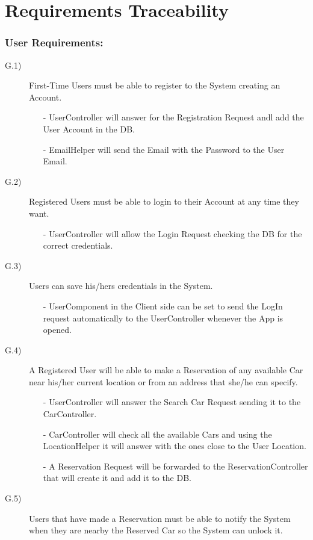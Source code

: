 \documentclass[a4paper]{article}
\begin{document}
\newpage
\section{Requirements Traceability}
\subsubsection{\textbf{User Requirements:}}
\begin{description}
\item [G.1)]First-Time Users must be able to register to the System creating an Account. 
\begin{itemize}
	\item[-]UserController will answer for the Registration Request andl add the User Account in the DB.
	\item[-]EmailHelper will send the Email with the Password to the User Email.
\end{itemize}
\item [G.2)]Registered Users must be able to login to their Account at any time they want.
\begin{itemize}
	\item[-]UserController will allow the Login Request checking the DB for the correct credentials.
\end{itemize}
\item [G.3)]Users can save his/hers credentials in the System.
\begin{itemize}
	\item[-]UserComponent in the Client side can be set to send the LogIn request automatically to the UserController whenever the App is opened.
\end{itemize}
\item [G.4)]A Registered User will be able to make a Reservation of any available Car near his/her current location or from an address that she/he can specify.
\begin{itemize}
	\item[-]UserController will answer the Search Car Request sending it to the CarController.
	\item[-]CarController will check all the available Cars and using the LocationHelper it will answer with the ones close to the User Location.
	\item[-]A Reservation Request will be forwarded to the ReservationController that will create it and add it to the DB.
\end{itemize}
\item [G.5)]Users that have made a Reservation must be able to notify the System when they are nearby the Reserved Car so the System can unlock it.

\end{description}
\end{document}
